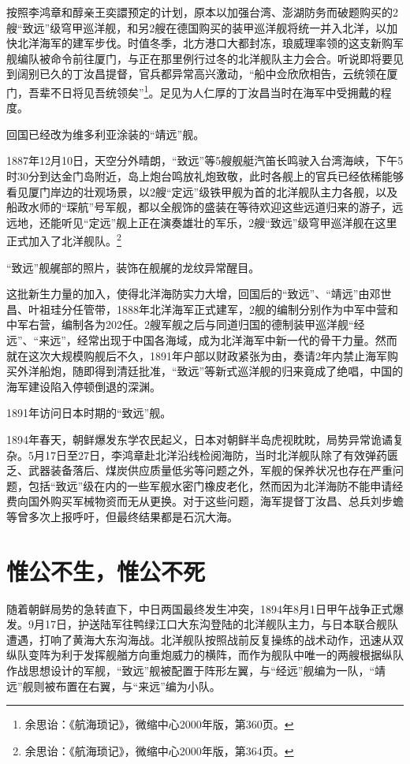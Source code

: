 \documentclass[12pt,UTF8]{ctexbook}
\begin{document}
按照李鸿章和醇亲王奕譞预定的计划，原本以加强台湾、澎湖防务而破题购买的2艘“致远”级穹甲巡洋舰，和另2艘在德国购买的装甲巡洋舰将统一并入北洋，以加快北洋海军的建军步伐。时值冬季，北方港口大都封冻，琅威理率领的这支新购军舰编队被命令前往厦门，与正在那里例行过冬的北洋舰队主力会合。听说即将要见到阔别已久的丁汝昌提督，官兵都异常高兴激动，“船中佥欣欣相告，云统领在厦门，吾辈不日将见吾统领矣”\footnote{余思诒：《航海琐记》，微缩中心2000年版，第360页。}。足见为人仁厚的丁汝昌当时在海军中受拥戴的程度。

回国已经改为维多利亚涂装的“靖远”舰。

1887年12月10日，天空分外晴朗，“致远”等5艘舰艇汽笛长鸣驶入台湾海峡，下午5时30分到达金门岛附近，岛上炮台鸣放礼炮致敬，此时各舰上的官兵已经依稀能够看见厦门岸边的壮观场景，以2艘“定远”级铁甲舰为首的北洋舰队主力各舰，以及船政水师的“琛航”号军舰，都以全舰饰的盛装在等待欢迎这些远道归来的游子，远远地，还能听见“定远”舰上正在演奏雄壮的军乐，2艘“致远”级穹甲巡洋舰在这里正式加入了北洋舰队。\footnote{余思诒：《航海琐记》，微缩中心2000年版，第364页。}

“致远”舰艉部的照片，装饰在舰艉的龙纹异常醒目。

这批新生力量的加入，使得北洋海防实力大增，回国后的“致远”、“靖远”由邓世昌、叶祖珪分任管带，1888年北洋海军正式建军，2舰的编制分别作为中军中营和中军右营，编制各为202任。2艘军舰之后与同道归国的德制装甲巡洋舰“经远”、“来远”，经常出现于中国各海域，成为北洋海军中新一代的骨干力量。然而就在这次大规模购舰后不久，1891年户部以财政紧张为由，奏请2年内禁止海军购买外洋船炮，随即得到清廷批准，“致远”等新式巡洋舰的归来竟成了绝唱，中国的海军建设陷入停顿倒退的深渊。

1891年访问日本时期的“致远”舰。

1894年春天，朝鲜爆发东学农民起义，日本对朝鲜半岛虎视眈眈，局势异常诡谲复杂。5月17日至27日，李鸿章赴北洋沿线检阅海防，当时北洋舰队除了有效弹药匮乏、武器装备落后、煤炭供应质量低劣等问题之外，军舰的保养状况也存在严重问题，包括“致远”级在内的一些军舰水密门橡皮老化，然而因为北洋海防不能申请经费向国外购买军械物资而无从更换。对于这些问题，海军提督丁汝昌、总兵刘步蟾等曾多次上报呼吁，但最终结果都是石沉大海。

\section{惟公不生，惟公不死}

随着朝鲜局势的急转直下，中日两国最终发生冲突，1894年8月1日甲午战争正式爆发。9月17日，护送陆军往鸭绿江口大东沟登陆的北洋舰队主力，与日本联合舰队遭遇，打响了黄海大东沟海战。北洋舰队按照战前反复操练的战术动作，迅速从双纵队变阵为利于发挥舰艏方向重炮威力的横阵，而作为舰队中唯一的两艘根据纵队作战思想设计的军舰，“致远”舰被配置于阵形左翼，与“经远”舰编为一队，“靖远”舰则被布置在右翼，与“来远”编为小队。
\end{document}
